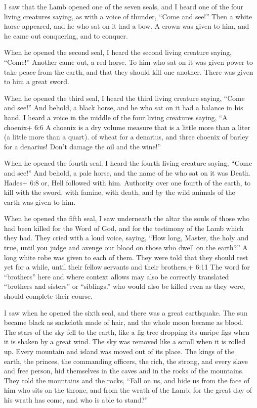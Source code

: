  I saw that the Lamb opened one of the seven seals, and I
heard one of the four living creatures saying, as with a voice of
thunder, ``Come and see!''  Then a white horse appeared, and
he who sat on it had a bow. A crown was given to him, and he came out
conquering, and to conquer.

 When he opened the second seal, I heard the second living
creature saying, ``Come!''  Another came out, a red horse.
To him who sat on it was given power to take peace from the earth, and
that they should kill one another. There was given to him a great sword.

 When he opened the third seal, I heard the third living
creature saying, ``Come and see!'' And behold, a black horse, and he who
sat on it had a balance in his hand.  I heard a voice in the
middle of the four living creatures saying, ``A choenix+ 6:6 A choenix
is a dry volume measure that is a little more than a liter (a little
more than a quart). of wheat for a denarius, and three choenix of barley
for a denarius! Don't damage the oil and the wine!''

 When he opened the fourth seal, I heard the fourth living
creature saying, ``Come and see!''  And behold, a pale
horse, and the name of he who sat on it was Death. Hades+ 6:8 or, Hell
followed with him. Authority over one fourth of the earth, to kill with
the sword, with famine, with death, and by the wild animals of the earth
was given to him.

 When he opened the fifth seal, I saw underneath the altar
the souls of those who had been killed for the Word of God, and for the
testimony of the Lamb which they had.  They cried with a
loud voice, saying, ``How long, Master, the holy and true, until you
judge and avenge our blood on those who dwell on the earth?''
 A long white robe was given to each of them. They were
told that they should rest yet for a while, until their fellow servants
and their brothers,+ 6:11 The word for ``brothers'' here and where
context allows may also be correctly translated ``brothers and sisters''
or ``siblings.'' who would also be killed even as they were, should
complete their course.

 I saw when he opened the sixth seal, and there was a great
earthquake. The sun became black as sackcloth made of hair, and the
whole moon became as blood.  The stars of the sky fell to
the earth, like a fig tree dropping its unripe figs when it is shaken by
a great wind.  The sky was removed like a scroll when it is
rolled up. Every mountain and island was moved out of its place.
 The kings of the earth, the princes, the commanding
officers, the rich, the strong, and every slave and free person, hid
themselves in the caves and in the rocks of the mountains. 
They told the mountains and the rocks, ``Fall on us, and hide us from
the face of him who sits on the throne, and from the wrath of the Lamb,
 for the great day of his wrath has come, and who is able
to stand?''

